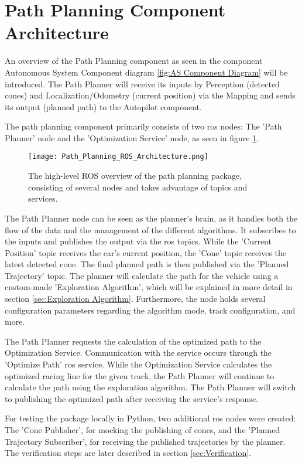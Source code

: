 \section{Path Planning Component Architecture} \label{sec:Path Planning Component Architecture}
An overview of the Path Planning component as seen in the component Autonomous System Component diagram \ref{fig:AS Component Diagram} will be introduced. The Path Planner will receive its inputs by Perception (detected cones) and Localization/Odometry (current position) via the Mapping and sends its output (planned path) to the Autopilot component.

The path planning component primarily consists of two \acrshort{ros} nodes: The 'Path Planner' node and the 'Optimization Service' node, as seen in figure \ref{fig:Path Planning ROS Architecture}.
\begin{figure}[H]
    \centering
    \texttt{[image: Path\_Planning\_ROS\_Architecture.png]}
    \caption{The high-level ROS overview of the path planning package, consisting of several nodes and takes advantage of topics and services.}
    \label{fig:Path Planning ROS Architecture}
\end{figure}

The Path Planner node can be seen as the planner's brain, as it handles both the flow of the data and the management of the different algorithms. It subscribes to the inputs and publishes the output via the \acrshort{ros} topics. While the 'Current Position' topic receives the car's current position, the 'Cone' topic receives the latest detected cone. The final planned path is then published via the 'Planned Trajectory' topic. The planner will calculate the path for the vehicle using a custom-made 'Exploration Algorithm', which will be explained in more detail in section \ref{sec:Exploration Algorithm}. Furthermore, the node holds several configuration parameters regarding the algorithm mode, track configuration, and more.

The Path Planner requests the calculation of the optimized path to the Optimization Service. Communication with the service occurs through the 'Optimize Path' \acrshort{ros} service. While the Optimization Service calculates the optimized racing line for the given track, the Path Planner will continue to calculate the path using the exploration algorithm. The Path Planner will switch to publishing the optimized path after receiving the service's response.

For testing the package locally in Python, two additional \acrshort{ros} nodes were created: The 'Cone Publisher', for mocking the publishing of cones, and the 'Planned Trajectory Subscriber', for receiving the published trajectories by the planner. The verification steps are later described in section \ref{sec:Verification}.

